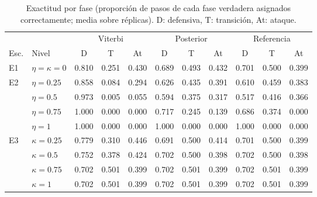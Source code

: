 \begin{table}[ht]
\centering
\caption{Exactitud por fase (proporción de pasos de cada fase verdadera asignados correctamente; media sobre réplicas). D: defensiva, T: transición, At: ataque.}
\label{tab:fase}
\footnotesize
\setlength{\tabcolsep}{4pt}
\begin{adjustbox}{max width=\textwidth}
\begin{tabular}{llccccccccc}
\toprule
 & & \multicolumn{3}{c}{Viterbi} & \multicolumn{3}{c}{Posterior} & \multicolumn{3}{c}{Referencia} \\
\cmidrule(lr){3-5}\cmidrule(lr){6-8}\cmidrule(lr){9-11}
Esc. & Nivel & D & T & At & D & T & At & D & T & At \\
\midrule
E1 & $\eta=\kappa=0$ & 0.810 & 0.251 & 0.430 & 0.689 & 0.493 & 0.432 & 0.701 & 0.500 & 0.399 \\
\midrule
E2 & $\eta=0.25$ & 0.858 & 0.084 & 0.294 & 0.626 & 0.435 & 0.391 & 0.610 & 0.459 & 0.383 \\
 & $\eta=0.5$ & 0.973 & 0.005 & 0.055 & 0.594 & 0.375 & 0.317 & 0.517 & 0.416 & 0.366 \\
 & $\eta=0.75$ & 1.000 & 0.000 & 0.000 & 0.717 & 0.245 & 0.139 & 0.686 & 0.374 & 0.000 \\
 & $\eta=1$ & 1.000 & 0.000 & 0.000 & 1.000 & 0.000 & 0.000 & 1.000 & 0.000 & 0.000 \\
\midrule
E3 & $\kappa=0.25$ & 0.779 & 0.310 & 0.446 & 0.691 & 0.500 & 0.414 & 0.701 & 0.500 & 0.399 \\
 & $\kappa=0.5$ & 0.752 & 0.378 & 0.424 & 0.702 & 0.500 & 0.398 & 0.702 & 0.500 & 0.398 \\
 & $\kappa=0.75$ & 0.702 & 0.501 & 0.399 & 0.702 & 0.501 & 0.399 & 0.702 & 0.501 & 0.399 \\
 & $\kappa=1$ & 0.702 & 0.501 & 0.399 & 0.702 & 0.501 & 0.399 & 0.702 & 0.501 & 0.399 \\
\bottomrule
\end{tabular}
\end{adjustbox}
\end{table}

